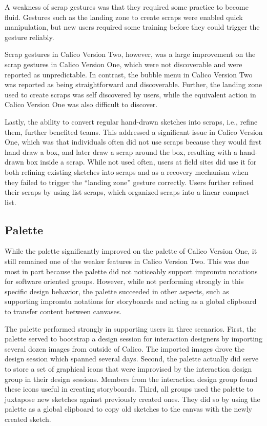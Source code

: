 \documentclass[12pt,fleqn]{ucithesis}
\begin{document}
A weakness of scrap gestures was that they required some practice to become fluid. Gestures such as the landing zone to create scraps were enabled quick manipulation, but new users required some training before they could trigger the gesture reliably. 

Scrap gestures in Calico Version Two, however, was a large improvement on the scrap gestures in Calico Version One, which were not discoverable and were reported as unpredictable. In contrast, the bubble menu in Calico Version Two was reported as being straightforward and discoverable. Further, the landing zone used to create scraps was self discovered by users, while the equivalent action in Calico Version One was also difficult to discover. 

Lastly, the ability to convert regular hand-drawn sketches into scraps, i.e., refine them, further benefited teams. This addressed a significant issue in Calico Version One, which was that individuals often did not use scraps because they would first hand draw a box, and later draw a scrap around the box, resulting with a hand-drawn box inside a scrap. While not used often, users at field sites did use it for both refining existing sketches into scraps and as a recovery mechanism when they failed to trigger the ``landing zone'' gesture correctly.  Users further refined their scraps by using list scraps, which organized scraps into a linear compact list. 

\subsection{Palette}

While the palette significantly improved on the palette of Calico Version One, it still remained one of the weaker features in Calico Version Two. This was due most in part because the palette did not noticeably support impromtu notations for software oriented groups. However, while not performing strongly in this specific design behavior, the palette succeeded in other aspects, such as supporting impromtu notations for storyboards and acting as a global clipboard to transfer content between canvases.

The palette performed strongly in supporting users in three scenarios. First, the palette served to bootstrap a design session for interaction designers by importing several dozen images from outside of Calico. The imported images drove the design session which spanned several days. Second, the palette actually did serve to store a set of graphical icons that were improvised by the interaction design group in their design sessions. Members from the interaction design group found these icons useful in creating storyboards. Third, all groups used the palette to juxtapose new sketches against previously created ones. They did so by using the palette as a global clipboard to copy old sketches to the canvas with the newly created sketch.
\end{document}
